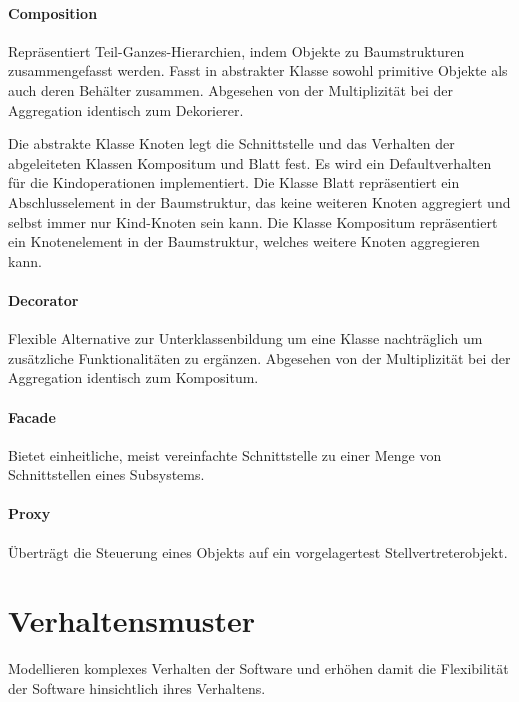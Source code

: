 \paragraph{Composition}\label{composition}

Repräsentiert Teil-Ganzes-Hierarchien, indem Objekte zu Baumstrukturen
zusammengefasst werden. Fasst in abstrakter Klasse sowohl primitive Objekte als
auch deren Behälter zusammen.
Abgesehen von der Multiplizität bei der Aggregation identisch zum Dekorierer.

Die abstrakte Klasse Knoten legt die Schnittstelle und das Verhalten der
abgeleiteten Klassen Kompositum und Blatt fest. Es wird ein Defaultverhalten für
die Kindoperationen implementiert. Die Klasse Blatt repräsentiert ein
Abschlusselement in der Baumstruktur, das keine weiteren Knoten aggregiert und
selbst immer nur Kind-Knoten sein kann. Die Klasse Kompositum repräsentiert ein
Knotenelement in der Baumstruktur, welches weitere Knoten aggregieren kann.

\paragraph{Decorator}\label{decorator}

Flexible Alternative zur Unterklassenbildung um eine Klasse nachträglich um
zusätzliche Funktionalitäten zu ergänzen.
Abgesehen von der Multiplizität bei der Aggregation identisch zum Kompositum.

\paragraph{Facade}\label{facade}

Bietet einheitliche, meist vereinfachte Schnittstelle zu einer Menge von
Schnittstellen eines Subsystems.

\paragraph{Proxy}\label{proxy}

Überträgt die Steuerung eines Objekts auf ein vorgelagertest
Stellvertreterobjekt.

\section{Verhaltensmuster}\label{verhaltensmuster}
Modellieren komplexes Verhalten der Software und erhöhen damit die Flexibilität
der Software hinsichtlich ihres Verhaltens.

